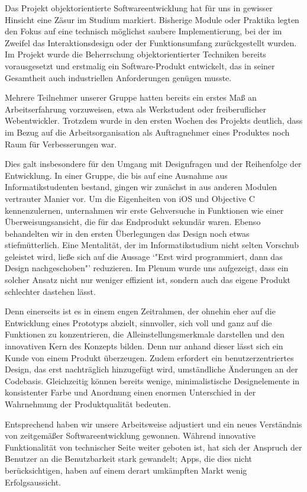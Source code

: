 

Das Projekt objektorientierte Softwareentwicklung hat für uns in gewisser Hinsicht eine Zäsur im Studium markiert. Bisherige Module oder Praktika legten den Fokus auf eine technisch möglichst saubere Implementierung, bei der im Zweifel das Interaktionsdesign oder der Funktionsumfang zurückgestellt wurden. Im Projekt wurde die Beherrschung objektorientierter Techniken bereits vorausgesetzt und erstmalig ein Software-Produkt entwickelt, das in seiner Gesamtheit auch industriellen Anforderungen genügen musste. 

Mehrere Teilnehmer unserer Gruppe hatten bereits ein erstes Maß an Arbeitserfahrung vorzuweisen, etwa als Werkstudent oder freiberuflicher Webentwickler. Trotzdem wurde in den ersten Wochen des Projekts deutlich, dass im Bezug auf die Arbeitsorganisation als Auftragnehmer eines Produktes noch Raum für Verbesserungen war. 

Dies galt insbesondere für den Umgang mit Designfragen und der Reihenfolge der Entwicklung. In einer Gruppe, die bis auf eine Ausnahme aus Informatikstudenten bestand, gingen wir zunächst in aus anderen Modulen vertrauter Manier vor. Um die Eigenheiten von iOS und Objective C kennenzulernen, unternahmen wir erste Gehversuche in Funktionen wie einer Überweisungsansicht, die für das Endprodukt sekundär waren. Ebenso behandelten wir in den ersten Überlegungen das Design noch etwas stiefmütterlich. Eine Mentalität, der im Informatikstudium nicht selten Vorschub geleistet wird, ließe sich auf die Aussage `"Erst wird programmiert, dann das Design nachgeschoben"' reduzieren. Im Plenum wurde uns aufgezeigt, dass ein solcher Ansatz nicht nur weniger effizient ist, sondern auch das eigene Produkt schlechter dastehen lässt. 

Denn einerseits ist es in einem engen Zeitrahmen, der ohnehin eher auf die Entwicklung eines Prototyps abzielt, sinnvoller, sich voll und ganz auf die Funktionen zu konzentrieren, die Alleinstellungsmerkmale darstellen und den innovativen Kern des Konzepts bilden. Denn nur anhand dieser lässt sich ein Kunde von einem Produkt überzeugen. Zudem erfordert ein benutzerzentriertes Design, das erst nachträglich hinzugefügt wird, umständliche Änderungen an der Codebasis. Gleichzeitig können bereits wenige, minimalistische Designelemente in konsistenter Farbe und Anordnung einen enormen Unterschied in der Wahrnehmung der Produktqualität bedeuten.

Entsprechend haben wir unsere Arbeitsweise adjustiert und ein neues Verständnis von zeitgemäßer Softwareentwicklung gewonnen. Während innovative Funktionalität von technischer Seite weiter geboten ist, hat sich der Anspruch der Benutzer an die Benutzbarkeit stark gewandelt; Apps, die dies nicht berücksichtigen, haben auf einem derart umkämpften Markt wenig Erfolgsaussicht.

